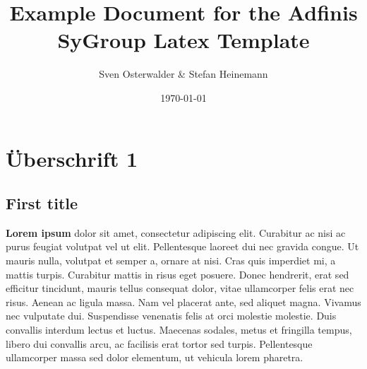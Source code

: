 \documentclass[oneside]{report}
\title{Example Document for the Adfinis SyGroup Latex Template}
\author{Sven Osterwalder \& Stefan Heinemann}
\date{\today}
\begin{document}
\maketitle{}
%

\tableofcontents{}

\chapter{Überschrift 1}

\section{First title}

\textbf{Lorem ipsum} dolor sit amet, consectetur adipiscing elit. Curabitur ac nisi ac purus feugiat volutpat vel ut elit. Pellentesque laoreet dui nec gravida congue. Ut mauris nulla, volutpat et semper a, ornare at nisi. Cras quis imperdiet mi, a mattis turpis. Curabitur mattis in risus eget posuere. Donec hendrerit, erat sed efficitur tincidunt, mauris tellus consequat dolor, vitae ullamcorper felis erat nec risus. Aenean ac ligula massa. Nam vel placerat ante, sed aliquet magna. Vivamus nec vulputate dui. Suspendisse venenatis felis at orci molestie molestie. Duis convallis interdum lectus et luctus. Maecenas sodales, metus et fringilla tempus, libero dui convallis arcu, ac facilisis erat tortor sed turpis. Pellentesque ullamcorper massa sed dolor elementum, ut vehicula lorem pharetra.
\end{document}
